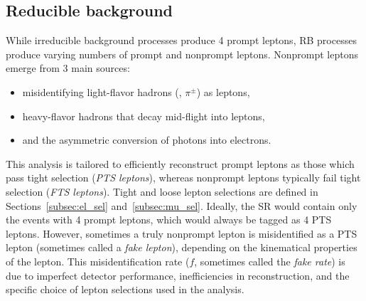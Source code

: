 \subsection{Reducible background}
\label{sec:redbkg}
While irreducible background processes produce 4 prompt leptons, RB processes produce varying numbers of prompt and nonprompt leptons.
Nonprompt leptons emerge from 3 main sources:
\begin{itemize}
    \item misidentifying light-flavor hadrons (\eg, $\pi^{\pm}$) as leptons,
    \item heavy-flavor hadrons that decay mid-flight into leptons,
    \item and the asymmetric conversion of photons into electrons.
\end{itemize}

This analysis is tailored to efficiently reconstruct prompt leptons as those which pass tight selection (\emph{PTS leptons}), whereas nonprompt leptons typically fail tight selection (\emph{FTS leptons}).
Tight and loose lepton selections are defined in Sections~\ref{subsec:el_sel} and~\ref{subsec:mu_sel}.
Ideally, the SR would contain only the events with 4 prompt leptons, which would always be tagged as 4 PTS leptons.
However, sometimes a truly nonprompt lepton is misidentified as a PTS lepton (sometimes called a \emph{fake lepton}), depending on the kinematical properties of the lepton.
This misidentification rate ($f$, sometimes called the \emph{fake rate}) is due to imperfect detector performance, inefficiencies in reconstruction, and the specific choice of lepton selections used in the analysis.

